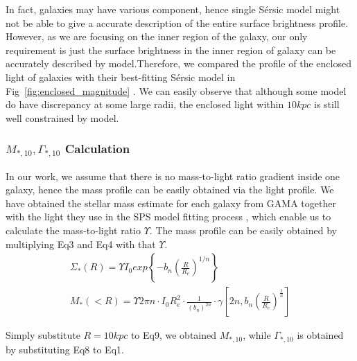 \documentclass[fleqn,usenatbib]{mnras}
\begin{document}
\par In fact, galaxies may have various component, hence single S\'{e}rsic model might not be able to give a accurate description of the entire surface brightness profile. However, as we are focusing on the inner region of the galaxy, our only requirement is just the surface brightness in the inner region of galaxy can be accurately described by model.Therefore, we compared the profile of the enclosed light of galaxies with their best-fitting S\'{e}rsic model in Fig~\ref{fig:enclosed_magnitude} . We can easily observe that although some model do have discrepancy at some large radii, the enclosed light within $10kpc$ is still well constrained by model. 
\subsubsection{$M_{*,10}, \Gamma_{*,10}$ Calculation}
\label{sec:cal}
In our work, we assume that there is no mass-to-light ratio gradient inside one galaxy, hence the mass profile can be easily obtained via the light profile. We have obtained the stellar mass estimate for each galaxy from GAMA together with the light they use in the SPS model fitting process \citep{GAMAmain}, which enable us to calculate the mass-to-light ratio $\Upsilon$. The mass profile can be easily obtained by multiplying Eq3 and Eq4 with that $\Upsilon$.
\begin{gather}
    \Sigma_*(R) = \Upsilon I_0 exp\left\{-b_n\left(\frac{R}{R_e}\right)^{1/n}\right\} \\
    M_*(<R) = \Upsilon 2\pi n\cdot I_0R_e^2 \cdot \frac{1}{\left(b_n\right)^{2n}}\cdot \gamma\left[2n,b_n \left(\frac{R}{R_e}\right)^{\frac{1}{n}}\right]
\end{gather}
\par Simply substitute $R = 10kpc$ to Eq9, we obtained $M_{*,10}$, while $\Gamma_{*,10}$ is obtained by substituting Eq8 to Eq1. 
\end{document}
